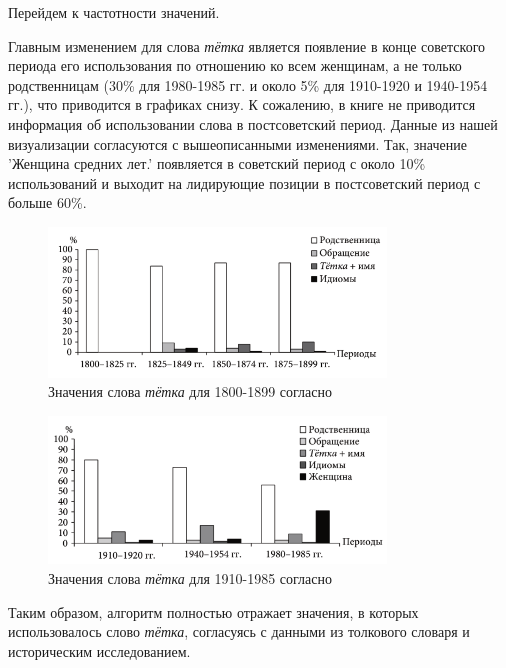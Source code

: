 Перейдем к частотности значений.

Главным изменением для слова \textit{тётка} является появление в конце советского периода
его использования по отношению ко всем женщинам, а не только родственницам (30\% для 1980-1985 гг.
и около 5\% для 1910-1920 и 1940-1954 гг.), что приводится в графиках снизу.
К сожалению, в книге не приводится информация об использовании слова в постсоветский период.
Данные из нашей визуализации согласуются с вышеописанными изменениями.
Так, значение ’Женщина средних лет.’ появляется в советский период с около 10\%
использований и выходит на лидирующие позиции в постсоветский период с больше 60\%.

\noindent %
\begin{figure}[H]
    \centering %
    \includegraphics[width=0.8\textwidth]{img/book/tetka/1800-1899}
    \caption{Значения слова \textit{тётка} для 1800-1899 согласно~\cite{TwoCenturies}}
\end{figure}

\begin{figure}[H]
    \centering %
    \includegraphics[width=0.8\textwidth]{img/book/tetka/1910-1985}
    \caption{Значения слова \textit{тётка} для 1910-1985 согласно~\cite{TwoCenturies}}
\end{figure}

Таким образом, алгоритм полностью отражает значения, в которых использовалось
слово \textit{тётка}, согласуясь с данными из толкового словаря и историческим исследованием.

